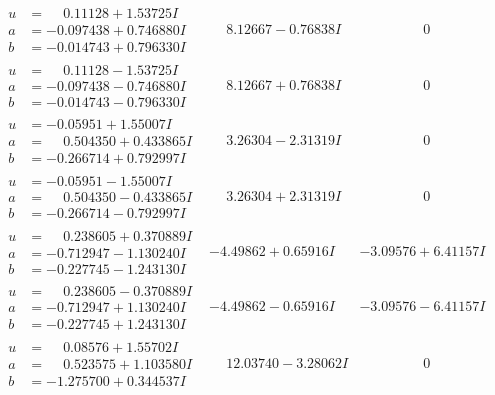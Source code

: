 \documentclass[1p]{elsarticle_modified}
\theoremstyle{definition}
\begin{document}
$$\begin{array}{c|c|c}
\begin{aligned}
u &= \phantom{-}0.11128 + 1.53725 I \\
a &= -0.097438 + 0.746880 I \\
b &= -0.014743 + 0.796330 I\end{aligned}
 & \phantom{-}8.12667 - 0.76838 I & \phantom{-0.000000 } 0 \\ \hline\begin{aligned}
u &= \phantom{-}0.11128 - 1.53725 I \\
a &= -0.097438 - 0.746880 I \\
b &= -0.014743 - 0.796330 I\end{aligned}
 & \phantom{-}8.12667 + 0.76838 I & \phantom{-0.000000 } 0 \\ \hline\begin{aligned}
u &= -0.05951 + 1.55007 I \\
a &= \phantom{-}0.504350 + 0.433865 I \\
b &= -0.266714 + 0.792997 I\end{aligned}
 & \phantom{-}3.26304 - 2.31319 I & \phantom{-0.000000 } 0 \\ \hline\begin{aligned}
u &= -0.05951 - 1.55007 I \\
a &= \phantom{-}0.504350 - 0.433865 I \\
b &= -0.266714 - 0.792997 I\end{aligned}
 & \phantom{-}3.26304 + 2.31319 I & \phantom{-0.000000 } 0 \\ \hline\begin{aligned}
u &= \phantom{-}0.238605 + 0.370889 I \\
a &= -0.712947 - 1.130240 I \\
b &= -0.227745 - 1.243130 I\end{aligned}
 & -4.49862 + 0.65916 I & -3.09576 + 6.41157 I \\ \hline\begin{aligned}
u &= \phantom{-}0.238605 - 0.370889 I \\
a &= -0.712947 + 1.130240 I \\
b &= -0.227745 + 1.243130 I\end{aligned}
 & -4.49862 - 0.65916 I & -3.09576 - 6.41157 I \\ \hline\begin{aligned}
u &= \phantom{-}0.08576 + 1.55702 I \\
a &= \phantom{-}0.523575 + 1.103580 I \\
b &= -1.275700 + 0.344537 I\end{aligned}
 & \phantom{-}12.03740 - 3.28062 I & \phantom{-0.000000 } 0 \\ \hline\begin{aligned}

\end{aligned}
\end{array}$$
\end{document}
